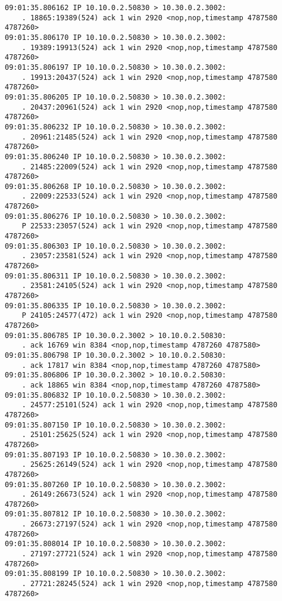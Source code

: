 \documentclass[a4paper,12pt]{article}
\begin{document}
\begin{Verbatim}
09:01:35.806162 IP 10.10.0.2.50830 > 10.30.0.2.3002: 
    . 18865:19389(524) ack 1 win 2920 <nop,nop,timestamp 4787580 4787260>
09:01:35.806170 IP 10.10.0.2.50830 > 10.30.0.2.3002: 
    . 19389:19913(524) ack 1 win 2920 <nop,nop,timestamp 4787580 4787260>
09:01:35.806197 IP 10.10.0.2.50830 > 10.30.0.2.3002: 
    . 19913:20437(524) ack 1 win 2920 <nop,nop,timestamp 4787580 4787260>
09:01:35.806205 IP 10.10.0.2.50830 > 10.30.0.2.3002: 
    . 20437:20961(524) ack 1 win 2920 <nop,nop,timestamp 4787580 4787260>
09:01:35.806232 IP 10.10.0.2.50830 > 10.30.0.2.3002: 
    . 20961:21485(524) ack 1 win 2920 <nop,nop,timestamp 4787580 4787260>
09:01:35.806240 IP 10.10.0.2.50830 > 10.30.0.2.3002: 
    . 21485:22009(524) ack 1 win 2920 <nop,nop,timestamp 4787580 4787260>
09:01:35.806268 IP 10.10.0.2.50830 > 10.30.0.2.3002: 
    . 22009:22533(524) ack 1 win 2920 <nop,nop,timestamp 4787580 4787260>
09:01:35.806276 IP 10.10.0.2.50830 > 10.30.0.2.3002: 
    P 22533:23057(524) ack 1 win 2920 <nop,nop,timestamp 4787580 4787260>
09:01:35.806303 IP 10.10.0.2.50830 > 10.30.0.2.3002: 
    . 23057:23581(524) ack 1 win 2920 <nop,nop,timestamp 4787580 4787260>
09:01:35.806311 IP 10.10.0.2.50830 > 10.30.0.2.3002: 
    . 23581:24105(524) ack 1 win 2920 <nop,nop,timestamp 4787580 4787260>
09:01:35.806335 IP 10.10.0.2.50830 > 10.30.0.2.3002: 
    P 24105:24577(472) ack 1 win 2920 <nop,nop,timestamp 4787580 4787260>
09:01:35.806785 IP 10.30.0.2.3002 > 10.10.0.2.50830: 
    . ack 16769 win 8384 <nop,nop,timestamp 4787260 4787580>
09:01:35.806798 IP 10.30.0.2.3002 > 10.10.0.2.50830: 
    . ack 17817 win 8384 <nop,nop,timestamp 4787260 4787580>
09:01:35.806806 IP 10.30.0.2.3002 > 10.10.0.2.50830: 
    . ack 18865 win 8384 <nop,nop,timestamp 4787260 4787580>
09:01:35.806832 IP 10.10.0.2.50830 > 10.30.0.2.3002: 
    . 24577:25101(524) ack 1 win 2920 <nop,nop,timestamp 4787580 4787260>
09:01:35.807150 IP 10.10.0.2.50830 > 10.30.0.2.3002: 
    . 25101:25625(524) ack 1 win 2920 <nop,nop,timestamp 4787580 4787260>
09:01:35.807193 IP 10.10.0.2.50830 > 10.30.0.2.3002: 
    . 25625:26149(524) ack 1 win 2920 <nop,nop,timestamp 4787580 4787260>
09:01:35.807260 IP 10.10.0.2.50830 > 10.30.0.2.3002: 
    . 26149:26673(524) ack 1 win 2920 <nop,nop,timestamp 4787580 4787260>
09:01:35.807812 IP 10.10.0.2.50830 > 10.30.0.2.3002: 
    . 26673:27197(524) ack 1 win 2920 <nop,nop,timestamp 4787580 4787260>
09:01:35.808014 IP 10.10.0.2.50830 > 10.30.0.2.3002: 
    . 27197:27721(524) ack 1 win 2920 <nop,nop,timestamp 4787580 4787260>
09:01:35.808199 IP 10.10.0.2.50830 > 10.30.0.2.3002: 
    . 27721:28245(524) ack 1 win 2920 <nop,nop,timestamp 4787580 4787260>

\end{Verbatim}
\end{document}
